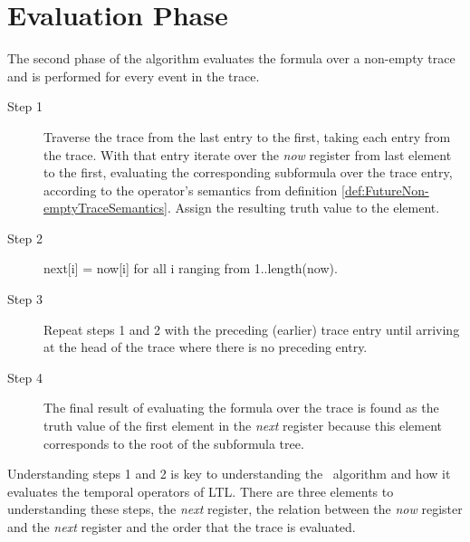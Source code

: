 \section{Evaluation Phase}
\label{sec:EvaluationPhase}
The second phase of the algorithm evaluates the formula over a non-empty trace and is performed for every event in the trace.\\
\begin{description}

\item[Step 1] Traverse the trace from the last entry to the first, taking each entry from the trace.  With that entry iterate over the \textit{now} register from last element to the first, evaluating the corresponding subformula over the trace entry, according to the operator's semantics from definition \ref{def:FutureNon-emptyTraceSemantics}.  Assign the resulting truth value to the element.

\item[Step 2] next[i] = now[i] for all i ranging from 1..length(now).

\item[Step 3] Repeat steps 1 and 2 with the preceding (earlier) trace entry until arriving at the head of the trace where there is no preceding entry.

\item[Step 4] The final result of evaluating the formula over the trace is found as the truth value of the first element in the \textit{next} register because this element corresponds to the root of the subformula tree.\\
\end{description}

Understanding steps 1 and 2 is key to understanding the \RH\ algorithm and how it evaluates the temporal operators of LTL.  There are three elements to understanding these steps, the \textit{next} register, the relation between the \textit{now} register and the \textit{next} register and the order that the trace is evaluated.

